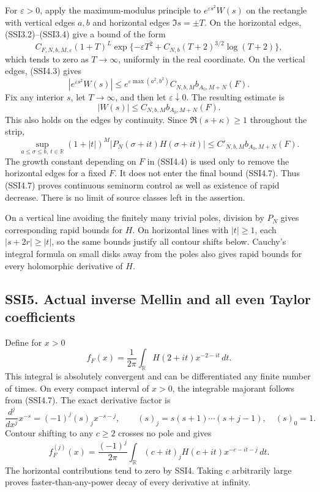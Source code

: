 For \(\varepsilon>0\), apply the maximum-modulus principle to
\(e^{\varepsilon s^2}W(s)\) on the rectangle with vertical edges \(a,b\)
and horizontal edges \(\Im s=\pm T\). On the horizontal edges,
(SSI3.2)--(SSI3.4) give a bound of the form \[
C_{F,N,b,M,\varepsilon}(1+T)^L
\exp\{-\varepsilon T^2+C_{N,b}(T+2)^{3/2}\log(T+2)\},
\tag{SSI4.4}
\] which tends to zero as \(T\to\infty\), uniformly in the real
coordinate. On the vertical edges, (SSI4.3) gives \[
|e^{\varepsilon s^2}W(s)|\le
e^{\varepsilon\max(a^2,b^2)}C_{N,b,M}b_{A_0,M+N}(F).
\tag{SSI4.5}
\] Fix any interior \(s\), let \(T\to\infty\), and then let
\(\varepsilon\downarrow0\). The resulting estimate is \[
|W(s)|\le C_{N,b,M}b_{A_0,M+N}(F).
\tag{SSI4.6}
\] This also holds on the edges by continuity. Since
\(\Re(s+\kappa)\ge1\) throughout the strip, \[
\boxed{\sup_{a\le\sigma\le b,\ t\in\mathbb R}
(1+|t|)^M|P_N(\sigma+it)H(\sigma+it)|
\le C'_{N,b,M}b_{A_0,M+N}(F).}
\tag{SSI4.7}
\] The growth constant depending on \(F\) in (SSI4.4) is used only to
remove the horizontal edges for a fixed \(F\). It does not enter the
final bound (SSI4.7). Thus (SSI4.7) proves continuous seminorm control
as well as existence of rapid decrease. There is no limit of source
classes left in the assertion.

On a vertical line avoiding the finitely many trivial poles, division by
\(P_N\) gives corresponding rapid bounds for \(H\). On horizontal lines
with \(|t|\ge1\), each \(|s+2r|\ge|t|\), so the same bounds justify all
contour shifts below. Cauchy's integral formula on small disks away from
the poles also gives rapid bounds for every holomorphic derivative of
\(H\).

\subsection{SSI5. Actual inverse Mellin and all even Taylor
coefficients}\label{ssi5.-actual-inverse-mellin-and-all-even-taylor-coefficients}

Define for \(x>0\) \[
f_F(x)=\frac1{2\pi}\int_{\mathbb R}H(2+it)x^{-2-it}\,dt.
\tag{SSI5.1}
\] This integral is absolutely convergent and can be differentiated any
finite number of times. On every compact interval of \(x>0\), the
integrable majorant follows from (SSI4.7). The exact derivative factor
is \[
\frac{d^j}{dx^j}x^{-s}=(-1)^j(s)_j x^{-s-j},
\qquad (s)_j=s(s+1)\cdots(s+j-1),\quad(s)_0=1.
\tag{SSI5.2}
\] Contour shifting to any \(c\ge2\) crosses no pole and gives \[
f_F^{(j)}(x)=\frac{(-1)^j}{2\pi}
\int_{\mathbb R}(c+it)_jH(c+it)x^{-c-it-j}\,dt.
\tag{SSI5.3}
\] The horizontal contributions tend to zero by SSI4. Taking \(c\)
arbitrarily large proves faster-than-any-power decay of every derivative
at infinity.

